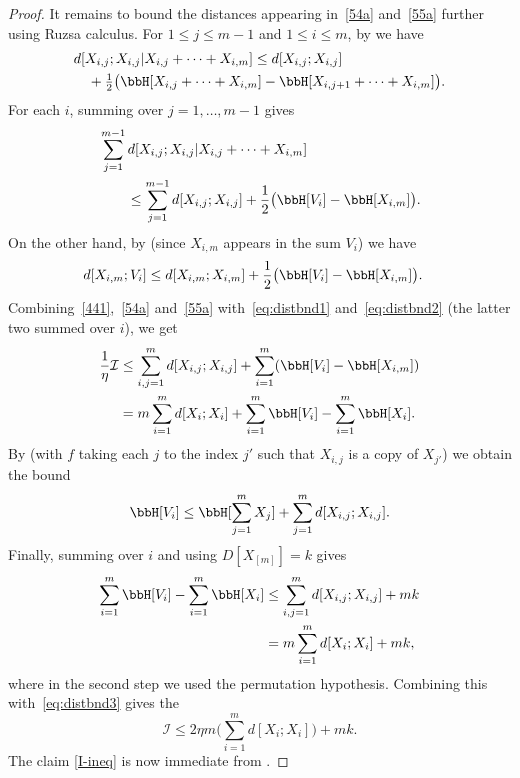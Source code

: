 \begin{proof}
It remains to bound the distances appearing in~\eqref{54a} and~\eqref{55a} further using Ruzsa calculus.
For $1 \leq j \leq m-1$ and $1 \leq i \leq m$, by  we have
\begin{align*} &d[ X_{i,j}; X_{i,j}| X_{i,j}+\cdots+X_{i,m}]
\leq d[X_{i,j}; X_{i,j}] \\
&\quad + \tfrac{1}{2} \bigl(\bbH[X_{i,j}+\cdots+X_{i,m}] - \bbH[X_{i,{j+1}}+\cdots+X_{i,m}]\bigr).
\end{align*}
For each $i$, summing over $j = 1,\dots, m-1$ gives
\begin{align}
  \nonumber
  &\sum_{j=1}^{m-1} d[X_{i,j}; X_{i,j}| X_{i,j}+\cdots+X_{i,m}] \\
  &\qquad \leq \sum_{j=1}^{m-1} d[X_{i,j}; X_{i,j}] + \frac12 \bigl( \bbH[V_i] - \bbH[X_{i,m}] \bigr).
  \label{eq:distbnd1}
\end{align}
On the other hand, by  (since $X_{i,m}$ appears in the sum $V_i$) we have
\begin{align}
  d[X_{i,m}; V_i]
  &\leq d[X_{i,m}; X_{i,m}] + \frac12 \bigl( \bbH[V_i] - \bbH[X_{i,m}] \bigr).
  \label{eq:distbnd2}
\end{align}
Combining~\eqref{441},~\eqref{54a} and~\eqref{55a} with~\eqref{eq:distbnd1} and~\eqref{eq:distbnd2} (the latter two summed over $i$), we get
\begin{align}
  \nonumber
  \frac1{\eta} {\mathcal I} &\leq \sum_{i,j=1}^m d[X_{i,j};X_{i,j}] + \sum_{i=1}^m (\bbH[V_i] - \bbH[X_{i,m}]) \\
      &= m \sum_{i=1}^m d[X_i; X_i] + \sum_{i=1}^m \bbH[V_i] - \sum_{i=1}^m \bbH[X_i].
      \label{eq:distbnd3}
\end{align}
By  (with $f$ taking each $j$ to the index $j'$ such that $X_{i,j}$ is a copy of $X_{j'}$) we obtain the bound
\[
  \bbH[V_i] \leq \bbH[\sum_{j=1}^m X_j] + \sum_{j=1}^m d[X_{i,j}; X_{i,j}].
\]
Finally, summing over $i$ and using $D[X_{[m]}] = k$ gives
\begin{align*}
  \sum_{i=1}^m \bbH[V_i] - \sum_{i=1}^m \bbH[X_i] & \leq \sum_{i,j=1}^m d[X_{i,j}; X_{i,j}] + m k \\ & = m\sum_{i = 1}^m d[X_i; X_i] + mk,
\end{align*}
where in the second step we used the permutation hypothesis. Combining this with~\eqref{eq:distbnd3} gives the
$$
{\mathcal I} \leq 2\eta m \biggl( \sum_{i=1}^m d[X_i;X_i] \biggr) + mk.$$
The claim \eqref{I-ineq} is now immediate from .
\end{proof}

